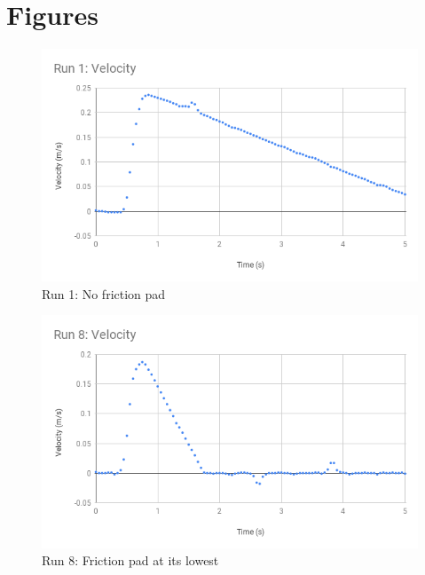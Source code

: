 \section{Figures}
%
\begin{figure}[ht]
    \centering
    \includegraphics[scale=0.71]{image/03-first-law/Run-1-Velocity.png}
    \caption{Run 1: No friction pad}
    \label{figure:03.run-1}
\end{figure}
%
\begin{figure}[ht]
    \centering
    \includegraphics[scale=0.71]{image/03-first-law/Run-8-Velocity.png}
    \caption{Run 8: Friction pad at its lowest}
    \label{figure:03.run-8}
\end{figure}
%